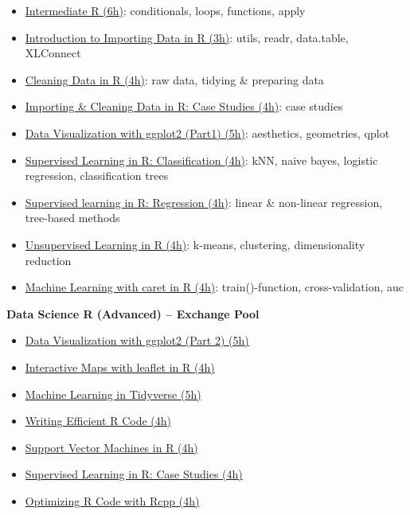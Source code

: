 \documentclass[
  11pt,
]{book}
\providecommand{\tightlist}{%
  \setlength{\itemsep}{0pt}\setlength{\parskip}{0pt}}
\begin{document}
\begin{tips}
\begin{itemize}
\tightlist
\item
  \href{https://www.datacamp.com/courses/intermediate-r}{Intermediate R
  (6h)}: conditionals, loops, functions, apply
\item
  \href{https://www.datacamp.com/courses/importing-data-in-r-part-1}{Introduction
  to Importing Data in R (3h)}: utils, readr, data.table, XLConnect
\item
  \href{https://www.datacamp.com/courses/cleaning-data-in-r}{Cleaning
  Data in R (4h)}: raw data, tidying \& preparing data
\item
  \href{https://www.datacamp.com/courses/importing-cleaning-data-in-r-case-studies}{Importing
  \& Cleaning Data in R: Case Studies (4h)}: case studies
\item
  \href{https://www.datacamp.com/courses/data-visualization-with-ggplot2-1}{Data
  Visualization with ggplot2 (Part1) (5h)}: aesthetics, geometries,
  qplot
\item
  \href{https://www.datacamp.com/courses/supervised-learning-in-r-classification}{Supervised
  Learning in R: Classification (4h)}: kNN, naive bayes, logistic
  regression, classification trees
\item
  \href{https://www.datacamp.com/courses/supervised-learning-in-r-regression}{Supervised
  learning in R: Regression (4h)}: linear \& non-linear regression,
  tree-based methods
\item
  \href{https://www.datacamp.com/courses/unsupervised-learning-in-r}{Unsupervised
  Learning in R (4h)}: k-means, clustering, dimensionality reduction
\item
  \href{https://www.datacamp.com/courses/machine-learning-toolbox}{Machine
  Learning with caret in R (4h)}: train()-function, cross-validation,
  auc
\end{itemize}

\textbf{Data Science R (Advanced) -- Exchange Pool}

\begin{itemize}
\tightlist
\item
  \href{https://www.datacamp.com/courses/data-visualization-with-ggplot2-2}{Data
  Visualization with ggplot2 (Part 2) (5h)}
\item
  \href{https://www.datacamp.com/courses/interactive-maps-with-leaflet-in-r}{Interactive
  Maps with leaflet in R (4h)}
\item
  \href{https://www.datacamp.com/courses/machine-learning-in-the-tidyverse}{Machine
  Learning in Tidyverse (5h)}
\item
  \href{https://www.datacamp.com/courses/writing-efficient-r-code}{Writing
  Efficient R Code (4h)}
\item
  \href{https://www.datacamp.com/courses/support-vector-machines-in-r}{Support
  Vector Machines in R (4h)}
\item
  \href{https://www.datacamp.com/courses/supervised-learning-in-r-case-studies}{Supervised
  Learning in R: Case Studies (4h)}
\item
  \href{https://www.datacamp.com/courses/optimizing-r-code-with-rcpp}{Optimizing
  R Code with Rcpp (4h)}
\end{itemize}


\end{tips}
\end{document}

